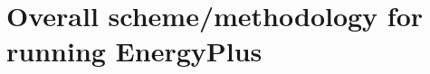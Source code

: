 \chapter{Overall scheme/methodology for running EnergyPlus}\label{overall-schememethodology-for-running-energyplus}
